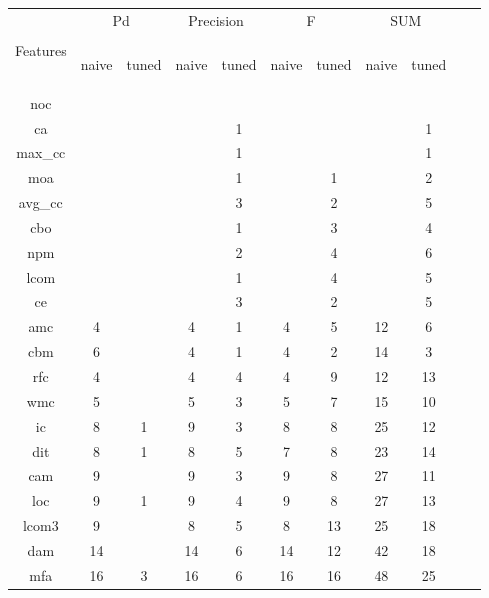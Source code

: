 \documentclass{sig-alternative}
\def\baselinestretch{1}
\begin{document}
\begin{figure}[!ht]

\renewcommand{\baselinestretch}{0.8}
\scriptsize
\centering
  \begin{tabular}{c|c c|c c|c c|c c| c c }
  
    & \multicolumn{2}{c|}{Pd} &  \multicolumn{2}{c|}{Precision} & \multicolumn{2}{c|}{F} &  \multicolumn{2}{c|}{SUM}\\
 &&&&&&&&\\
Features& \begin{sideways}naive\end{sideways}
& \begin{sideways}tuned\end{sideways}
& \begin{sideways}naive\end{sideways}
& \begin{sideways}tuned\end{sideways}
& \begin{sideways}naive\end{sideways}
& \begin{sideways}tuned\end{sideways}
& \begin{sideways}naive\end{sideways}
& \begin{sideways}tuned\end{sideways}
\\\hline
noc&	&	&	&	&	&	&	 &	 &	\\
ca&	&	&	&	1&	&	&	 &	1&	\\
max\_cc&	&	&	&	1&	&	&	 &	1&	\\
moa&	&	&	&	1&	&	1&	 &	2&	\\
avg\_cc&	&	&	&	3&	&	2&	 &	5&	\\
cbo&	&	&	&	1&	&	3&	 &	4&	\\
npm&	&	&	&	2&	&	4&	 &	6&	\\
lcom&	&	&	&	1&	&	4&	 &	5&	\\
ce&	&	&	&	3&	&	2&	 &	5&	\\
amc&	4&	&	4&	1&	4&	5&	12&	6&	\\
cbm&	6&	&	4&	1&	4&	2&	14&	3&	\\
rfc&	4&	&	4&	4&	4&	9&	12&	13&	\\
wmc&	5&	&	5&	3&	5&	7&	15&	10&	\\
ic&	8&	1&	9&	3&	8&	8&	25&	12&	\\
dit&	8&	1&	8&	5&	7&	8&	23&	14&	\\
cam&	9&	&	9&	3&	9&	8&	27&	11&	\\
loc&	9&	1&	9&	4&	9&	8&	27&	13&	\\
lcom3&	9&	&	8&	5&	8&	13&	25&	18&	\\
dam&	14&	&	14&	6&	14&	12&	42&	18&	\\
mfa&	16&	3&	16&	6&	16&	16&	48&	25&	\\


\end{tabular}
\end{figure}
\end{document}
